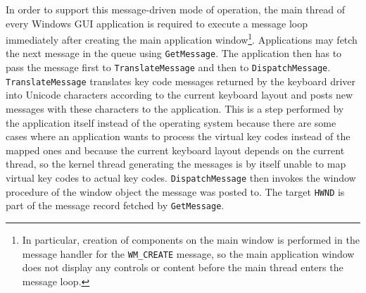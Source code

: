 			In order to support this message-driven mode of operation, the main
			thread of every Windows GUI application is required to execute a
			message loop immediately after creating the main application
			window\footnote{In particular, creation of components on the main
			window is performed in the message handler for the
			\texttt{WM\_CREATE} message, so the main application window does
			not display any controls or content before the main thread enters
			the message loop.}. Applications may fetch the next message in the
			queue using \texttt{GetMessage}. The application then has to pass
			the message first to \texttt{TranslateMessage} and then to
			\texttt{DispatchMessage}. \texttt{TranslateMessage} translates key
			code messages returned by the keyboard driver into Unicode
			characters according to the current keyboard layout and posts new
			messages with these characters to the application. This is a step performed
			by the application itself instead of the operating system because
			there are some cases where an application wants to process the virtual
			key codes instead of the mapped ones \cite{translatemessage} and because the current keyboard
			layout depends on the current thread, so the kernel thread generating
			the messages is by itself unable to map virtual key codes to actual
			key codes. \texttt{DispatchMessage} then invokes the window procedure
			of the window object the message was posted to. The target \texttt{HWND}
			is part of the message record fetched by \texttt{GetMessage}. \cite{messages}


